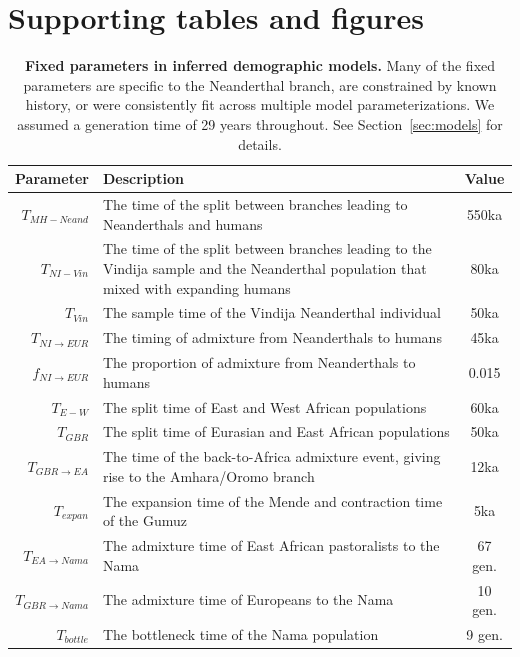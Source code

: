 \documentclass[]{article}
\begin{document}
\section*{Supporting tables and figures}

\begin{table}[ht]
    \caption{
        \label{tab:fixed-params}
        \textbf{Fixed parameters in inferred demographic models.}
        Many of the fixed parameters are specific to the Neanderthal branch, are
        constrained by known history, or were consistently fit across multiple
        model parameterizations. We assumed a generation time of 29 years throughout.
        See Section~\ref{sec:models} for details.
    }
    \centering
    \begin{tabular}[t]{rP{8cm}c}
        \toprule
        Parameter & Description & Value \\
        \midrule
        $T_{MH-Neand}$ & The time of the split between branches leading to Neanderthals and humans & 550ka \\
        $T_{NI-Vin}$ & The time of the split between branches leading to the Vindija sample and the Neanderthal population that mixed with expanding humans & 80ka \\
        $T_{Vin}$ & The sample time of the Vindija Neanderthal individual & 50ka \\
        $T_{NI\rightarrow EUR}$ & The timing of admixture from Neanderthals to humans & 45ka \\
        $f_{NI\rightarrow EUR}$ & The proportion of admixture from Neanderthals to humans & 0.015 \\
        $T_{E-W}$ & The split time of East and West African populations & 60ka \\
        $T_{GBR}$ & The split time of Eurasian and East African populations & 50ka \\
        $T_{GBR\rightarrow EA}$ & The time of the back-to-Africa admixture event, giving rise to the Amhara/Oromo branch & 12ka \\
        $T_{expan}$ & The expansion time of the Mende and contraction time of the Gumuz & 5ka \\
        $T_{EA\rightarrow Nama}$ & The admixture time of East African pastoralists to the Nama & 67 gen. \\
        $T_{GBR\rightarrow Nama}$ & The admixture time of Europeans to the Nama & 10 gen. \\
        $T_{bottle}$ & The bottleneck time of the Nama population & 9 gen. \\
        \bottomrule
    \end{tabular}
\end{table}
\end{document}
